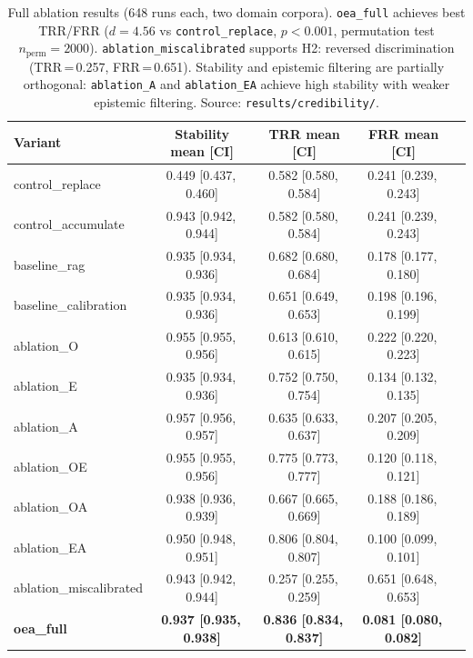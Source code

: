 \documentclass[11pt]{article}
\begin{document}
\begin{table}[h]
\centering
\small
\begin{tabular}{lcccc}
\toprule
Variant & Stability mean [CI] & TRR mean [CI] & FRR mean [CI] \\
\midrule
control\_replace       & 0.449 [0.437,\,0.460] & 0.582 [0.580,\,0.584] & 0.241 [0.239,\,0.243] \\
control\_accumulate    & 0.943 [0.942,\,0.944] & 0.582 [0.580,\,0.584] & 0.241 [0.239,\,0.243] \\
baseline\_rag          & 0.935 [0.934,\,0.936] & 0.682 [0.680,\,0.684] & 0.178 [0.177,\,0.180] \\
baseline\_calibration  & 0.935 [0.934,\,0.936] & 0.651 [0.649,\,0.653] & 0.198 [0.196,\,0.199] \\
ablation\_O            & 0.955 [0.955,\,0.956] & 0.613 [0.610,\,0.615] & 0.222 [0.220,\,0.223] \\
ablation\_E            & 0.935 [0.934,\,0.936] & 0.752 [0.750,\,0.754] & 0.134 [0.132,\,0.135] \\
ablation\_A            & 0.957 [0.956,\,0.957] & 0.635 [0.633,\,0.637] & 0.207 [0.205,\,0.209] \\
ablation\_OE           & 0.955 [0.955,\,0.956] & 0.775 [0.773,\,0.777] & 0.120 [0.118,\,0.121] \\
ablation\_OA           & 0.938 [0.936,\,0.939] & 0.667 [0.665,\,0.669] & 0.188 [0.186,\,0.189] \\
ablation\_EA           & 0.950 [0.948,\,0.951] & 0.806 [0.804,\,0.807] & 0.100 [0.099,\,0.101] \\
ablation\_miscalibrated & 0.943 [0.942,\,0.944] & 0.257 [0.255,\,0.259] & 0.651 [0.648,\,0.653] \\
\textbf{oea\_full}    & \textbf{0.937 [0.935,\,0.938]} & \textbf{0.836 [0.834,\,0.837]} & \textbf{0.081 [0.080,\,0.082]} \\
\bottomrule
\end{tabular}
\caption{Full ablation results (648 runs each, two domain corpora). \texttt{oea\_full} achieves best TRR/FRR ($d=4.56$ vs \texttt{control\_replace}, $p<0.001$, permutation test $n_{\mathrm{perm}}=2000$). \texttt{ablation\_miscalibrated} supports H2: reversed discrimination (TRR\,=\,0.257, FRR\,=\,0.651). Stability and epistemic filtering are partially orthogonal: \texttt{ablation\_A} and \texttt{ablation\_EA} achieve high stability with weaker epistemic filtering. Source: \texttt{results/credibility/}.}
\label{tab:ablation}
\end{table}
\end{document}
